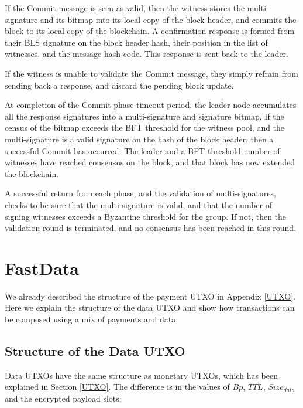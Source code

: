 \documentclass[a4paper, 10pt, conference]{ieeeconf}
\begin{document}
\begin{itemize}
{{	\item{If the Commit message is seen as valid, then the witness stores the multi-signature and its bitmap into its local copy of the block header, and commits the block to its local copy of the blockchain. A confirmation response is formed from their BLS signature on the block header hash, their position in the list of witnesses, and the message hash code. This response is sent back to the leader.}

	\item{If the witness is unable to validate the Commit message, they simply refrain from sending back a response, and discard the pending block update.}}

	\item{At completion of the Commit phase timeout period, the leader node accumulates all the response signatures into a multi-signature and signature bitmap. If the census of the bitmap exceeds the BFT threshold for the witness pool, and the multi-signature is a valid signature on the hash of the block header, then a successful Commit has occurred. The leader and a BFT threshold number of witnesses have reached consensus on the block, and that block has now extended the blockchain.}
	}
\end{itemize}

A successful return from each phase, and the validation of multi-signatures, checks to be sure that the multi-signature is valid, and that the number of signing witnesses exceeds a Byzantine threshold for the group. If not, then the validation round is terminated, and no consensus has been reached in this round.

\section{FastData}\label{FastDataAppendix}

We already described the structure of the payment UTXO in Appendix \ref{UTXO}. Here we explain the structure of the data UTXO and show how transactions can be composed using a mix of payments and data.

\subsection{Structure of the Data UTXO}

Data UTXOs have the same structure as monetary UTXOs, which has been explained in Section \ref{UTXO}. The difference is in the values of $Bp$, $TTL$, $Size_{data}$ and the encrypted payload slots:
\end{document}
